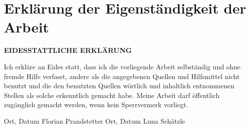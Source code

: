 \chapter*{Erklärung der Eigenständigkeit der Arbeit}
\label{cha:affirmation}


\textbf{EIDESSTATTLICHE ERKLÄRUNG }
\vspace{1cm}

Ich erkläre an Eides statt, dass ich die vorliegende Arbeit selbständig und ohne fremde Hilfe verfasst, andere als die angegebenen Quellen und Hilfsmittel nicht benutzt und die den benutzten Quellen wörtlich und inhaltlich entnommenen Stellen als solche erkenntlich gemacht habe. Meine Arbeit darf öffentlich zugänglich gemacht werden, wenn kein Sperrvermerk vorliegt.

\vfill\vfill



Ort, Datum  \hspace{5cm}Florian Prandstetter     
\vfill    
Ort, Datum  \hspace{5cm}Luna Schätzle                                                  
